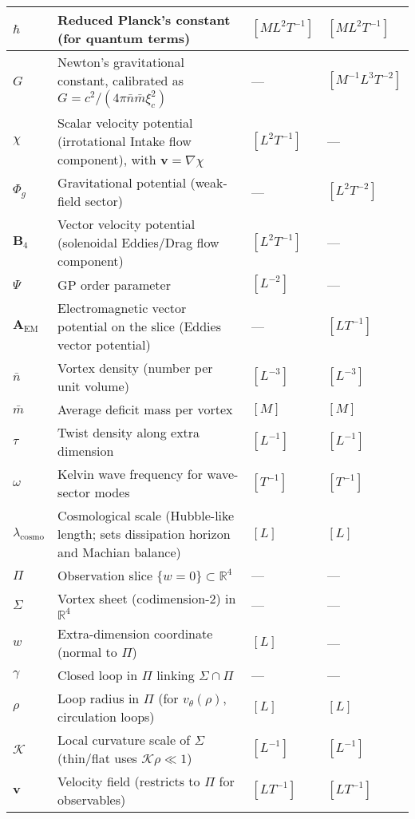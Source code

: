 \begin{table}[H]
\begin{tabularx}{\textwidth}{|l|Y|l|l|}
\hline
$\hbar$ & Reduced Planck's constant (for quantum terms) & $[M L^2 T^{-1}]$ & $[M L^2 T^{-1}]$ \\
\hline
$G$ & Newton's gravitational constant, calibrated as $G = c^2 / (4\pi \bar{n} \bar{m} \xi_c^2)$ & --- & $[M^{-1} L^3 T^{-2}]$ \\
\hline
$\chi$ & Scalar velocity potential (irrotational Intake flow component), with $\mathbf v=\nabla\chi$ & $[L^2 T^{-1}]$ & --- \\
\hline
$\Phi_g$ & Gravitational potential (weak-field sector) & --- & $[L^2 T^{-2}]$ \\
\hline
$\mathbf{B}_4$ & Vector velocity potential (solenoidal Eddies/Drag flow component) & $[L^2 T^{-1}]$ & --- \\
\hline
$\Psi$ & GP order parameter & $[L^{-2}]$ & --- \\
\hline
$\mathbf{A}_{\text{EM}}$ & Electromagnetic vector potential on the slice (Eddies vector potential) & --- & $[L T^{-1}]$ \\
\hline
$\bar{n}$ & Vortex density (number per unit volume) & $[L^{-3}]$ & $[L^{-3}]$ \\
\hline
$\bar{m}$ & Average deficit mass per vortex & $[M]$ & $[M]$ \\
\hline
$\tau$ & Twist density along extra dimension & $[L^{-1}]$ & $[L^{-1}]$ \\
\hline
$\omega$ & Kelvin wave frequency for wave-sector modes & $[T^{-1}]$ & $[T^{-1}]$ \\
\hline
$\lambda_{\text{cosmo}}$ & Cosmological scale (Hubble-like length; sets dissipation horizon and Machian balance) & $[L]$ & $[L]$ \\
\hline
$\Pi$ & Observation slice $\{w=0\}\subset\mathbb{R}^4$ & --- & --- \\
\hline
$\Sigma$ & Vortex sheet (codimension-2) in $\mathbb{R}^4$ & --- & --- \\
\hline
$w$ & Extra-dimension coordinate (normal to $\Pi$) & $[L]$ & --- \\
\hline
$\gamma$ & Closed loop in $\Pi$ linking $\Sigma\cap\Pi$ & --- & --- \\
\hline
$\rho$ & Loop radius in $\Pi$ (for $v_\theta(\rho)$, circulation loops) & $[L]$ & $[L]$ \\
\hline
$\mathcal{K}$ & Local curvature scale of $\Sigma$ (thin/flat uses $\mathcal{K}\rho\ll1$) & $[L^{-1}]$ & $[L^{-1}]$ \\
\hline
$\mathbf{v}$ & Velocity field (restricts to $\Pi$ for observables) & $[L T^{-1}]$ & $[L T^{-1}]$ \\

\end{tabularx}
\end{table}
